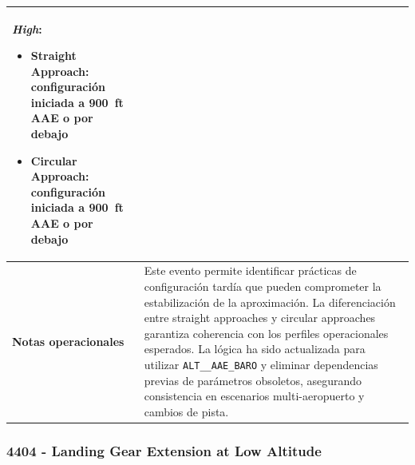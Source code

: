 \documentclass[11pt,a4paper]{article}
\begin{document}
\begin{longtable}{p{5cm} p{9.5cm}}
		\textit{High}:  
		\begin{itemize}
			\item Straight Approach: configuración iniciada a \SI{900}{ft} AAE o por debajo
			\item Circular Approach: configuración iniciada a \SI{900}{ft} AAE o por debajo
		\end{itemize} \\
		\hline
		
		\textbf{Notas operacionales} &
		Este evento permite identificar prácticas de configuración tardía que pueden comprometer la estabilización de la aproximación.  
		La diferenciación entre straight approaches y circular approaches garantiza coherencia con los perfiles operacionales esperados.  
		La lógica ha sido actualizada para utilizar \texttt{ALT\_\_AAE\_BARO} y eliminar dependencias previas de parámetros obsoletos, asegurando consistencia en escenarios multi-aeropuerto y cambios de pista. \\
		\hline
	\end{longtable}
	
	\subsubsection{4404 - Landing Gear Extension at Low Altitude}
	
\end{document}
